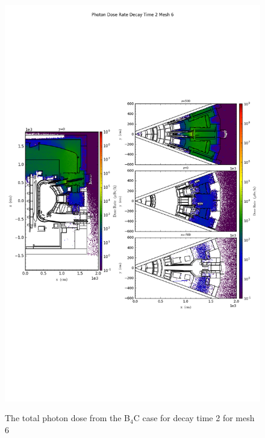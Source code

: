 \begin{figure}[ht!]
\centering
\includegraphics[trim={0cm 9cm 0cm 10cm},clip,scale=0.75]{../plots/final_model_with_b4c/Photon_Dose_Rate_Decay_Time_2_Mesh_6.png}
\label{fig:photons_dc2_no4bc_m6_flux}
\caption{The total photon dose from the B$_4$C case for decay time 2 for mesh 6}
\end{figure}
